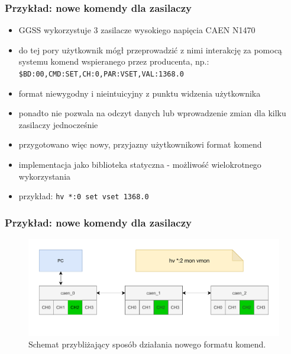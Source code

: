 \documentclass[10pt]{beamer}
\begin{document}
\begin{frame}
\frametitle{Przykład: nowe komendy dla zasilaczy}
\begin{itemize}
    \item GGSS wykorzystuje 3 zasilacze wysokiego napięcia CAEN N1470
    \item do tej pory użytkownik mógł przeprowadzić z nimi interakcję za pomocą systemu komend wspieranego przez producenta, np.: {\color{blue} \lstinline{$BD:00,CMD:SET,CH:0,PAR:VSET,VAL:1368.0}}
    \item format niewygodny i nieintuicyjny z punktu widzenia użytkownika
    \item ponadto nie pozwala na odczyt danych lub wprowadzenie zmian dla kilku zasilaczy jednocześnie
    \item przygotowano więc nowy, przyjazny użytkownikowi format komend
    \item implementacja jako biblioteka statyczna - możliwość wielokrotnego wykorzystania
    \item przykład: {\color{blue} \lstinline{hv *:0 set vset 1368.0}}
\end{itemize}
\end{frame}

\begin{frame}
\frametitle{Przykład: nowe komendy dla zasilaczy}
\begin{figure}
\includegraphics[width=\textwidth]{static/hv_psu_1.pdf}
\caption{Schemat przybliżający sposób działania nowego formatu komend.}
\end{figure}
\end{frame}
\end{document}
